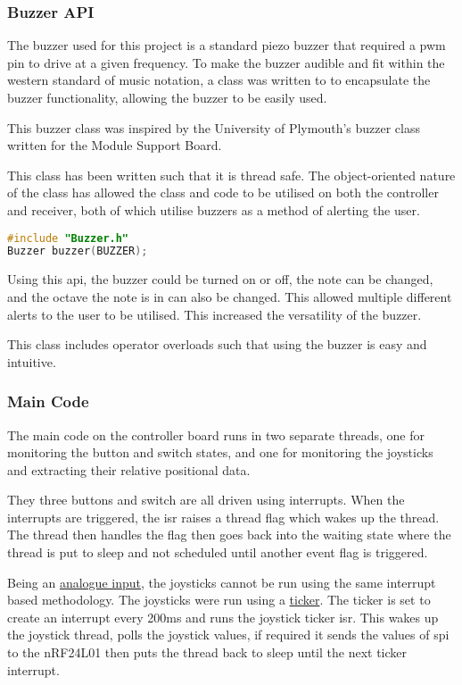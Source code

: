 \documentclass [12pt]{article}
\begin{document}
\subsubsection{Buzzer API}\label{sec:buzzer_api}

The buzzer used for this project is a standard piezo buzzer that required a \gls{pwm} pin to drive at a given frequency. To make the buzzer audible and fit within the western standard of music notation, a class was written to to encapsulate the buzzer functionality, allowing the buzzer to be easily used. 

This buzzer class was inspired by the University of Plymouth's buzzer class written for the Module Support Board. 

This class has been written such that it is thread safe. The object-oriented nature of the class has allowed the class and code to be utilised on both the controller and receiver, both of which utilise buzzers as a method of alerting the user. 

\begin{lstlisting}[language=C++,label=code:buzzer_decleration,caption= Buzzer Class Constructor]
#include "Buzzer.h"
Buzzer buzzer(BUZZER);
\end{lstlisting}

Using this \gls{api}, the buzzer could be turned on or off, the note can be changed, and the octave the note is in can also be changed. This allowed multiple different alerts to the user to be utilised. This increased the versatility of the buzzer. 

This class includes operator overloads such that using the buzzer is easy and intuitive.

\subsubsection{Main Code}

The main code on the controller board runs in two separate threads, one for monitoring the button and switch states, and one for monitoring the joysticks and extracting their relative positional data. 

They three buttons and switch are all driven using interrupts. When the interrupts are triggered, the \gls{isr} raises a thread flag which wakes up the thread. The thread then handles the flag then goes back into the waiting state where the thread is put to sleep and not scheduled until another event flag is triggered. 

Being an \href{https://os.mbed.com/docs/mbed-os/v6.15/apis/i-o-apis.html}{analogue input}, the joysticks cannot be run using the same interrupt based methodology. The joysticks were run using a \href{https://os.mbed.com/docs/mbed-os/v6.15/apis/ticker.html}{ticker}. The ticker is set to create an interrupt every 200ms and runs the joystick ticker \gls{isr}. This wakes up the joystick thread, polls the joystick values, if required it sends the values of \gls{spi} to the nRF24L01 then puts the thread back to sleep until the next ticker interrupt.
\end{document}
